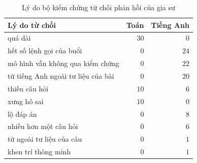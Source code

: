 \begin{table}[H]
\centering
\caption{Lý do bộ kiểm chứng từ chối phản hồi của gia sư}\label{tab:db-rejected}
\begin{tabular}{lrr}
\toprule
Lý do từ chối & Toán & Tiếng Anh \\
\midrule
quá dài & $30$ & $0$ \\
hết số lệnh gọi của buổi & $0$ & $24$ \\
mô hình vẫn không qua kiểm chứng & $0$ & $22$ \\
từ tiếng Anh ngoài tư liệu của bài & $0$ & $20$ \\
thiếu câu hỏi & $10$ & $6$ \\
xưng hô sai & $10$ & $0$ \\
lộ đáp án & $0$ & $8$ \\
nhiều hơn một câu hỏi & $0$ & $6$ \\
từ ngoài tư liệu của câu & $0$ & $1$ \\
khen trí thông minh & $0$ & $1$ \\
\bottomrule
\end{tabular}
\end{table}
